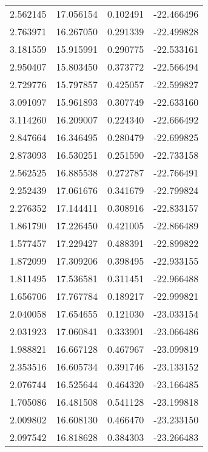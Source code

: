 \begin{tabular}{rrrr}
        2.562145 &        17.056154 &    0.102491 & -22.466496 \\
        2.763971 &        16.267050 &    0.291339 & -22.499828 \\
        3.181559 &        15.915991 &    0.290775 & -22.533161 \\
        2.950407 &        15.803450 &    0.373772 & -22.566494 \\
        2.729776 &        15.797857 &    0.425057 & -22.599827 \\
        3.091097 &        15.961893 &    0.307749 & -22.633160 \\
        3.114260 &        16.209007 &    0.224340 & -22.666492 \\
        2.847664 &        16.346495 &    0.280479 & -22.699825 \\
        2.873093 &        16.530251 &    0.251590 & -22.733158 \\
        2.562525 &        16.885538 &    0.272787 & -22.766491 \\
        2.252439 &        17.061676 &    0.341679 & -22.799824 \\
        2.276352 &        17.144411 &    0.308916 & -22.833157 \\
        1.861790 &        17.226450 &    0.421005 & -22.866489 \\
        1.577457 &        17.229427 &    0.488391 & -22.899822 \\
        1.872099 &        17.309206 &    0.398495 & -22.933155 \\
        1.811495 &        17.536581 &    0.311451 & -22.966488 \\
        1.656706 &        17.767784 &    0.189217 & -22.999821 \\
        2.040058 &        17.654655 &    0.121030 & -23.033154 \\
        2.031923 &        17.060841 &    0.333901 & -23.066486 \\
        1.988821 &        16.667128 &    0.467967 & -23.099819 \\
        2.353516 &        16.605734 &    0.391746 & -23.133152 \\
        2.076744 &        16.525644 &    0.464320 & -23.166485 \\
        1.705086 &        16.481508 &    0.541128 & -23.199818 \\
        2.009802 &        16.608130 &    0.466470 & -23.233150 \\
        2.097542 &        16.818628 &    0.384303 & -23.266483 \\

\end{tabular}
